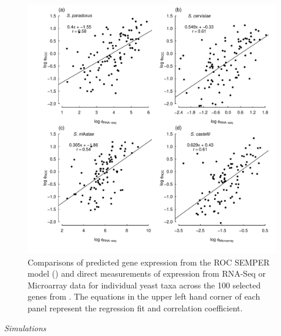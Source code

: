 \documentclass[12pt,letterpaper]{article}
\renewcommand{\subsection}[1]{%
\bigskip
\begin{center}
\begin{large}
\normalfont\itshape #1
\end{large}
\end{center}}
\begin{document}
\begin{figure}[H]
  \centering
  \includegraphics[width=0.9\linewidth]{FIGURE_S2_Empirical_vs_ROC_by_spp.pdf}
  \caption{Comparisons of predicted gene expression from the ROC SEMPER model (\citet{GilchristEtAl2015}) and direct measurements of expression from RNA-Seq or Microarray data for individual yeast taxa across the 100 selected genes from \citet{SalichosAndRokas2013}.
      	The equations in the upper left hand corner of each panel represent the regression fit and correlation coefficient.
  }
  \label{fig:ROCvsEmpirical}
\end{figure}


\subsection{Simulations}
\end{document}
